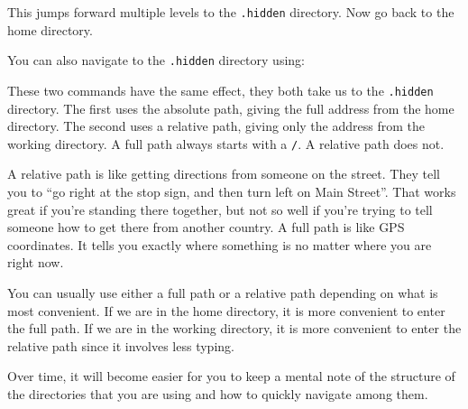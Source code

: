 \documentclass[
  letterpaper,
  DIV=11,
  numbers=noendperiod]{scrreprt}
\newenvironment{Shaded}{\begin{snugshade}}{\end{snugshade}}
\newcommand{\ExtensionTok}[1]{\textcolor[rgb]{0.00,0.23,0.31}{#1}}
\newcommand{\NormalTok}[1]{\textcolor[rgb]{0.00,0.23,0.31}{#1}}
\newcommand{\PreprocessorTok}[1]{\textcolor[rgb]{0.68,0.00,0.00}{#1}}
\newcommand{\SpecialStringTok}[1]{\textcolor[rgb]{0.13,0.47,0.30}{#1}}
\begin{document}
\begin{Shaded}
\end{Shaded}

This jumps forward multiple levels to the \texttt{.hidden} directory.
Now go back to the home directory.

\begin{Shaded}
\end{Shaded}

You can also navigate to the \texttt{.hidden} directory using:

\begin{Shaded}
\end{Shaded}

These two commands have the same effect, they both take us to the
\texttt{.hidden} directory. The first uses the absolute path, giving the
full address from the home directory. The second uses a relative path,
giving only the address from the working directory. A full path always
starts with a \texttt{/}. A relative path does not.

A relative path is like getting directions from someone on the street.
They tell you to ``go right at the stop sign, and then turn left on Main
Street''. That works great if you're standing there together, but not so
well if you're trying to tell someone how to get there from another
country. A full path is like GPS coordinates. It tells you exactly where
something is no matter where you are right now.

You can usually use either a full path or a relative path depending on
what is most convenient. If we are in the home directory, it is more
convenient to enter the full path. If we are in the working directory,
it is more convenient to enter the relative path since it involves less
typing.

Over time, it will become easier for you to keep a mental note of the
structure of the directories that you are using and how to quickly
navigate among them.
\end{document}
